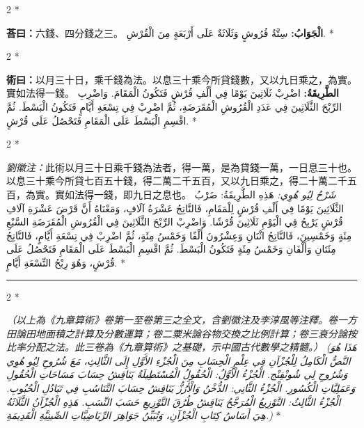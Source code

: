 \documentclass[11pt,a4paper]{article}
\newcommand{\ar}[1]{\arabicfont\beginR #1\endR}
\newenvironment{bilingual}{%
  \begin{paracol}{2}%
  \switchcolumn[0]*%
}{%
  \end{paracol}%
}
\newcommand{\cnline}[1]{\switchcolumn[0]\noindent #1 \switchcolumn[1]}
\newcommand{\arline}[1]{\noindent\ar{#1} \switchcolumn[0]*}
\newenvironment{prob bilingual}{%
  \begin{paracol}{2}%
  \switchcolumn[0]*%
}{%
  \end{paracol}%
  \vspace{0.3em}%
}
\begin{document}
\begin{bilingual}
\cnline{\textcolor{answercolor}{\textbf{荅曰：}}六錢、四分錢之三。}
\arline{\textcolor{answercolor}{\textbf{الْجَوَابُ:}} سِتَّةُ قُرُوشٍ وَثَلَاثَةٌ عَلَى أَرْبَعَةٍ مِنَ الْقُرْشِ.}
\end{bilingual}

\begin{bilingual}
\cnline{%
\textcolor{methodcolor}{\textbf{術曰：}}以月三十日，乘千錢為法。以息三十乘今所貸錢數，又以九日乘之，為實。實如法得一錢。
}
\arline{%
\textcolor{methodcolor}{\textbf{الطَّرِيقَةُ:}} اضْرِبْ ثَلَاثِينَ يَوْمًا فِي أَلْفِ قُرْشٍ فَتَكُونُ الْمَقَامَ. وَاضْرِبِ الرِّبْحَ الثَّلَاثِينَ فِي عَدَدِ الْقُرُوشِ الْمُقَرَضَةِ، ثُمَّ اضْرِبْ فِي تِسْعَةِ أَيَّامٍ فَتَكُونُ الْبَسْطَ. ثُمَّ اقْسِمِ الْبَسْطَ عَلَى الْمَقَامِ فَتَحْصُلُ عَلَى قُرْشٍ.
}
\end{bilingual}

\begin{bilingual}
\cnline{%
\textcolor{commentarycolor}{\small\textit{劉徽注：}}此術以月三十日乘千錢為法者，得一萬，是為貸錢一萬，一日息三十也。以息三十乘今所貸七百五十錢，得二萬二千五百，又以九日乘之，得二十萬二千五百，為實。實如法得一錢，即九日之息也。
}
\arline{%
\textcolor{commentarycolor}{\small\textit{شَرْحُ لِيُو هُوِي:}} هَذِهِ الطَّرِيقَةُ: ضَرْبُ الثَّلَاثِينَ يَوْمًا فِي أَلْفِ قُرْشٍ لِلْمَقَامِ، فَالنَّاتِجُ عَشْرَةُ آلَافٍ، وَمَعْنَاهُ أَنَّ قَرْضَ عَشْرَةِ آلَافِ قُرْشٍ يَرْبِحُ فِي الْيَوْمِ ثَلَاثِينَ قُرْشًا. وَاضْرِبْ الرِّبْحَ الثَّلَاثِينَ فِي الْقُرُوشِ الْمُقَرَضَةِ السَّبْعِ مِئَةٍ وَخَمْسِينَ، فَالنَّاتِجُ اثْنَانِ وَعِشْرُونَ أَلْفًا وَخَمْسُ مِئَةٍ، ثُمَّ اضْرِبْ فِي تِسْعَةِ أَيَّامٍ، فَالنَّاتِجُ مِئَتَانِ وَأَلْفَانِ وَخَمْسُ مِئَةٍ فَتَكُونُ الْبَسْطَ. ثُمَّ اقْسِمِ الْبَسْطَ عَلَى الْمَقَامِ فَتَحْصُلُ عَلَى قُرْشٍ، وَهُوَ رِبْحُ التِّسْعَةِ أَيَّامٍ.
}
\end{bilingual}

\vspace{1em}
\begin{center}
\rule{0.5\textwidth}{0.4pt}
\end{center}
\vspace{1em}

\begin{bilingual}
\cnline{%
\textit{（以上為《九章算術》卷第一至卷第三之全文，含劉徽注及李淳風等注釋。卷一方田論田地面積之計算及分數運算；卷二粟米論谷物交換之比例計算；卷三衰分論按比率分配之法。此三卷為《九章算術》之基礎，示中國古代數學之精髓。）}
}
\arline{%
\textit{\ar{(هَذَا هُوَ النَّصُّ الْكَامِلُ لِلْجُزْآنِ فِي عِلْمِ الْحِسَابِ مِنَ الْجُزْءِ الأَوَّلِ إِلَى الثَّالِثِ، مَعَ شُرُوحِ لِيُو هُوِي وَشُرُوحِ لِي شُونْفِنْج. الْجُزْءُ الْأَوَّلُ: الْحُقُولُ الْمُسْتَطِيلَةُ يَنَاقِشُ حِسَابَ مَسَاحَاتِ الْحُقُولِ وَعَمَلِيَّاتِ الْكُسُورِ. الْجُزْءُ الثَّانِي: الدُّخْنُ وَالْأَرُزُّ يَنَاقِشُ حِسَابَ التَّنَاسُبِ فِي تَبَادُلِ الْحُبُوبِ. الْجُزْءُ الثَّالِثُ: التَّوْزِيعُ الْمُرَجَّحُ يَنَاقِشُ طُرُقَ التَّوْزِيعِ حَسَبَ النِّسَبِ. هَذِهِ الْجُزْآنُ الثَّلَاثَةُ هِيَ أَسَاسُ كِتَابِ الْجُزْآنِ، وَتُبَيِّنُ جَوَاهِرَ الرِّيَاضِيَّاتِ الصِّينِيَّةِ الْقَدِيمَةِ.)}}
}
\end{bilingual}
\end{document}
